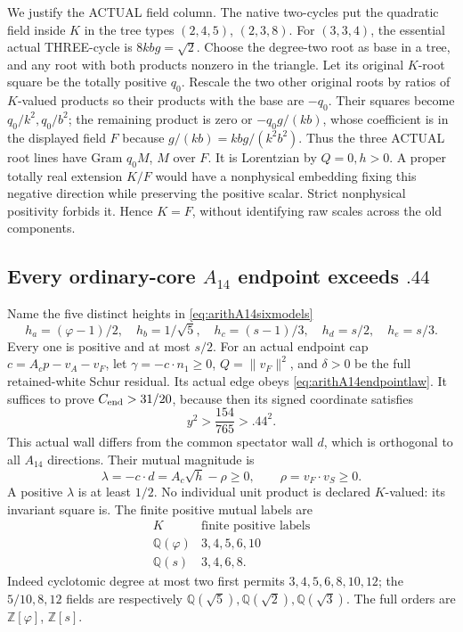 \documentclass[11pt]{article}
\begin{document}
We justify the ACTUAL field column.
The native two-cycles put the quadratic
field inside \(K\) in the tree types
\((2,4,5)\), \((2,3,8)\).
For \((3,3,4)\), the essential actual
THREE-cycle is \(8kbg=\sqrt2\).
Choose the degree-two root as base in a
tree, and any root with both products
nonzero in the triangle.
Let its original \(K\)-root square be
the totally positive \(q_0\).
Rescale the two other original roots by
ratios of \(K\)-valued products so their
products with the base are \(-q_0\).
Their squares become \(q_0/k^2,q_0/b^2\);
the remaining product is zero or
\(-q_0g/(kb)\), whose coefficient is in
the displayed field \(F\) because
\(g/(kb)=kbg/(k^2b^2)\).
Thus the three ACTUAL root lines have
Gram \(q_0M\), \(M\) over \(F\).
It is Lorentzian by \(Q=0,h>0\).
A proper totally real extension \(K/F\)
would have a nonphysical embedding fixing
this negative direction while preserving
the positive scalar.
Strict nonphysical positivity forbids it.
Hence \(K=F\), without identifying raw
scales across the old components.

\subsection[Every ordinary-core A14 endpoint exceeds .44]{Every ordinary-core \(A_{14}\) endpoint exceeds \(.44\)}
\label{app:arithA14ordinaryends}

Name the five distinct heights in
\eqref{eq:arithA14sixmodels}
\[
 h_a=(\varphi-1)/2,\quad h_b=1/\sqrt5,\quad
 h_c=(s-1)/3,\quad h_d=s/2,\quad h_e=s/3 .
\]
Every one is positive and at most \(s/2\).
For an actual endpoint cap
\(c=A_cp-v_A-v_F\), let
\(\gamma=-c\cdot n_1\ge0\),
\(Q=\|v_F\|^2\), and \(\delta>0\)
be the full retained-white Schur residual.
Its actual edge obeys
\eqref{eq:arithA14endpointlaw}.
It suffices to prove \(C_{\rm end}>31/20\),
because then its signed coordinate satisfies
\[
                           y^2>{\frac{154}{765}}>.44^2 .
\]
This actual wall differs from the common
spectator wall \(d\), which is orthogonal
to all \(A_{14}\) directions.
Their mutual magnitude is
\[
                \lambda=-c\cdot d=A_c\sqrt h-\rho\ge0,
                         \qquad \rho=v_F\cdot v_S\ge0.
\tag{A14mut}\label{eq:arithA14ordinarymutual}
\]
A positive \(\lambda\) is at least \(1/2\).
No individual unit product is declared
\(K\)-valued: its invariant square is.
The finite positive mutual labels are
\[
 \begin{array}{c|c}
 K&\text{finite positive labels}\\ \hline
 \mathbb Q(\varphi)&3,4,5,6,10\\
 \mathbb Q(s)&3,4,6,8 .
 \end{array}
\]
Indeed cyclotomic degree at most two first
permits \(3,4,5,6,8,10,12\);
the \(5/10,8,12\) fields are respectively
\(\mathbb Q(\sqrt5),\mathbb Q(\sqrt2),\mathbb Q(\sqrt3)\).
The full orders are \(\mathbb Z[\varphi]\),
\(\mathbb Z[s]\).
\end{document}
